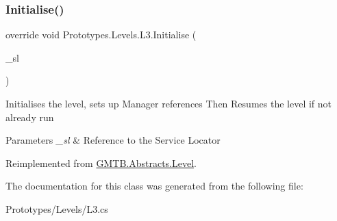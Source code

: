 \subsubsection{\texorpdfstring{Initialise()}{Initialise()}}
{\footnotesize\ttfamily override void Prototypes.\+Levels.\+L3.\+Initialise (\begin{DoxyParamCaption}\item[{\mbox{\hyperlink{interface_g_m_t_b_1_1_interfaces_1_1_i_service_locator}{I\+Service\+Locator}}}]{\+\_\+sl }\end{DoxyParamCaption})\hspace{0.3cm}{\ttfamily [virtual]}}



Initialises the level, sets up Manager references Then Resumes the level if not already run 


\begin{DoxyParams}{Parameters}
{\em \+\_\+sl} & Reference to the Service Locator \\
\hline
\end{DoxyParams}


Reimplemented from \mbox{\hyperlink{class_g_m_t_b_1_1_abstracts_1_1_level_a0048401bb0fb66b0fb0c19b3b25e4265}{G\+M\+T\+B.\+Abstracts.\+Level}}.



The documentation for this class was generated from the following file\+:\begin{DoxyCompactItemize}
\item 
Prototypes/\+Levels/L3.\+cs\end{DoxyCompactItemize}
